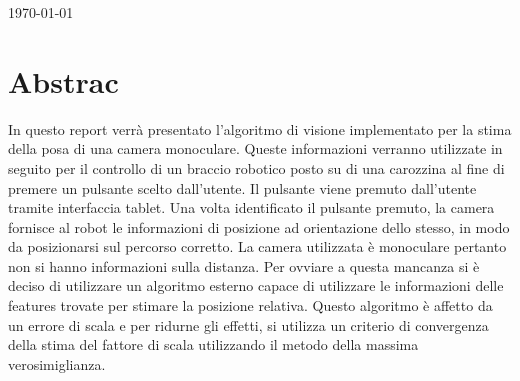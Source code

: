 \documentclass[laurea,oneside,11pt]{report}
\begin{document}
\begin{titlepage}
{\large \today}\\[3cm] %

 

\vfill %
\end{titlepage}



\newpage 
\section*{Abstrac} %
\label{sec:abstract}
In questo report verrà presentato l'algoritmo di visione implementato per la stima della posa di una camera monoculare. Queste informazioni verranno utilizzate in seguito per il controllo di un braccio robotico posto su di una carozzina al fine di premere un pulsante scelto dall'utente. 
Il pulsante viene premuto dall'utente tramite interfaccia tablet. Una volta identificato il pulsante premuto, la camera fornisce al robot le informazioni di posizione ad orientazione dello stesso, in modo da posizionarsi sul percorso corretto. La camera utilizzata è monoculare pertanto non si hanno informazioni sulla distanza. Per ovviare a questa mancanza si è deciso di utilizzare un algoritmo esterno capace di utilizzare le informazioni delle features trovate per stimare la posizione relativa. Questo algoritmo è affetto da un errore di scala e per ridurne gli effetti, si utilizza un criterio di convergenza della stima del fattore di scala utilizzando il metodo della massima verosimiglianza.  

\newpage 
\tableofcontents
\newpage 
\listoffigures
\end{document}
